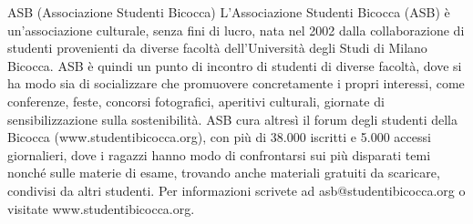 ASB (Associazione Studenti Bicocca)
L'Associazione Studenti Bicocca (ASB) è un'associazione culturale, senza fini di lucro, nata nel 2002 dalla collaborazione di studenti provenienti da diverse facoltà dell'Università degli Studi di Milano Bicocca. ASB è quindi un punto di incontro di studenti di diverse facoltà, dove si ha modo sia di socializzare che promuovere concretamente i propri interessi, come conferenze, feste, concorsi fotografici, aperitivi culturali, giornate di sensibilizzazione sulla sostenibilità. ASB cura altresì il forum degli studenti della Bicocca (www.studentibicocca.org), con più di 38.000 iscritti e 5.000 accessi giornalieri, dove i ragazzi hanno modo di confrontarsi sui più disparati temi nonché sulle materie di esame, trovando anche materiali gratuiti da scaricare, condivisi da altri studenti. Per informazioni scrivete ad asb@studentibicocca.org o visitate www.studentibicocca.org.

